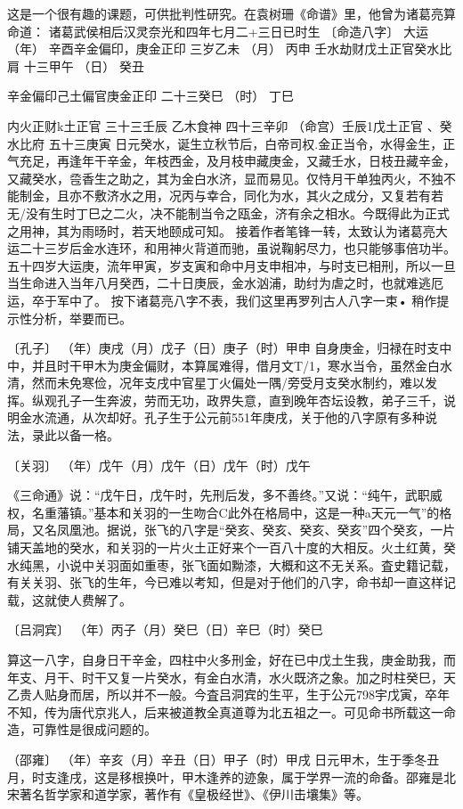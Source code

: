 \documentclass[a5paper,oneside,12pt]{ctexbook}
\begin{document}
这是一个很有趣的课题，可供批判性研究。在袁树珊《命谱》里，他曾为诸葛亮算命道：
诸葛武侯相后汉灵奈光和四年七月二+三日已时生
〔命造八字〕	大运
（年）	辛酉辛金偏印，庚金正印		三岁乙未
（月）	丙申	壬水劫财戊土正官癸水比肩	十三甲午
（日）	癸丑	{辛金偏印己土偏官庚金正印	二十三癸巳
（时）	丁巳	{内火正财k土正官	三十三壬辰
乙木食神	四十三辛卯
（命宫）壬辰1戊土正官
、癸水比府	五十三庚寅
日元癸水，诞生立秋节后，白帝司权.金正当令，水得金生，正气充足，再逢年干辛金，年枝西金，及月枝申藏庚金，又藏壬水，日枝丑藏辛金，又藏癸水，卺香生之助之，其为金白水济，显而易见。仅恃月干单独丙火，不独不能制金，且亦不敷济水之用，况丙与幸合，同化为水，其火之成分，又复若有若无/没有生时丁巳之二火，决不能制当令之瓯金，济有余之相水。今既得此为正式之用神，其为雨旸时，若天地颐成可知。
接着作者笔锋一转，太致认为诸葛亮大运二十三岁后金水连环，和用神火背道而驰，虽说鞠躬尽力，也只能够事倍功半。五十四岁大运庚，流年甲寅，岁支寅和命中月支申相冲，与时支已相刑，所以一旦当生命进入当年八月癸西，二十日庚辰，金水汹浦，助纣为虐之时，也就难逃厄运，卒于军中了。
按下诸葛亮八字不表，我们这里再罗列古人八字一束•
稍作提示性分析，举要而已。

〔孔子〕
（年）庚戌（月）戊子（日）庚子（时）甲申
自身庚金，归禄在时支中中，并且时干甲木为庚金偏财，本算属难得，借月文T/1，寒水当令，虽然金白水清，然而未免寒俭，况年支戌中官星丁火偏处一隅/旁受月支癸水制约，难以发挥。纵观孔子一生奔波，劳而无功，政界失意，直到晚年杏坛设教，弟子三千，说明金水流通，从次却好。孔子生于公元前551年庚戌，关于他的八字原有多种说法，录此以备一格。

〔关羽〕
（年）戊午（月）戊午（日）戊午（时）戊午

《三命通》说：“戊午日，戊午时，先刑后发，多不善终。”又说：“纯午，武职威权，名重藩镇。”基本和关羽的一生吻合C此外在格局中，这是一种a天元一气”的格局，又名凤凰池。据说，张飞的八字是“癸亥、癸亥、癸亥、癸亥”四个癸亥，一片铺天盖地的癸水，和关羽的一片火土正好来个一百八十度的大相反。火土红黄，癸水纯黑，小说中关羽面如重枣，张飞面如黝漆，大概和这不无关系。査史籍记载，有关关羽、张飞的生年，今已难以考知，但是对于他们的八字，命书却一直这样记载，这就使人费解了。

〔吕洞宾〕
（年）丙子（月）癸巳（日）辛巳（时）癸巳

算这一八字，自身日干辛金，四柱中火多刑金，好在已中戊土生我，庚金助我，而年支、月干、时干又复一片癸水，有金白水清，水火既济之象。加之时柱癸巳，天乙贵人贴身而居，所以并不一般。今査吕洞宾的生平，生于公元798宇戊寅，卒年不知，传为唐代京兆人，后来被道教全真道尊为北五祖之一。可见命书所载这一命造，可靠性是很成问题的。

（邵雍〕
（年）辛亥（月）辛丑（日）甲子（时）甲戌
日元甲木，生于季冬丑月，时支逢戌，这是移根换叶，甲木逢养的迹象，属于学界一流的命备。邵雍是北宋著名哲学家和道学家，著作有《皇极经世》、《伊川击壤集》等。

}}
\end{document}
